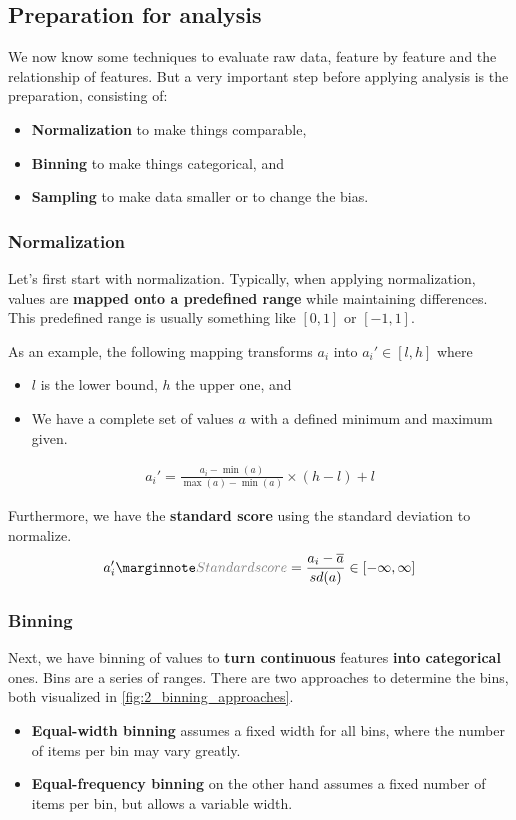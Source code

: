 \subsection{Preparation for analysis}

We now know some techniques to evaluate raw data, feature by feature and the relationship of features. But a very important step before applying analysis is the preparation, consisting of:
\begin{itemize}
  \item \textbf{Normalization} to make things comparable, 
  \item \textbf{Binning} to make things categorical, and 
  \item \textbf{Sampling} to make data smaller or to change the bias.
\end{itemize}

\subsubsection*{Normalization}
Let's first start with normalization. Typically, when applying normalization, values are \textbf{mapped onto a predefined range} while maintaining differences. This predefined range is usually something like $[0, 1]$ or $[-1, 1]$. 

As an example, the following mapping transforms $a_i$ into $a_i'\in[l, h]$ where
\begin{itemize}
  \item $l$ is the lower bound, $h$ the upper one, and
  \item We have a complete set of values $a$ with a defined minimum and maximum given.
\end{itemize}
\begin{align*}
  a_i' = \frac{a_i - \min(a)}{\max(a) - \min(a)} \times (h-l) + l
\end{align*}

Furthermore, we have the \textbf{standard score} using the standard deviation to normalize.
\begin{align*}
  a_i'\sidenote{Standard score} = \frac{a_i - \overline{a}}{sd(a)}\in[-\infty, \infty]
\end{align*}

\subsubsection*{Binning}
Next, we have binning of values to \textbf{turn continuous} features \textbf{into categorical} ones. Bins are a series of ranges. There are two approaches to determine the bins, both visualized in \ref{fig:2_binning_approaches}.
\begin{itemize}
  \item \textbf{Equal-width binning} assumes a fixed width for all bins, where the number of items per bin may vary greatly.
  \item \textbf{Equal-frequency binning} on the other hand assumes a fixed number of items per bin, but allows a variable width. 
\end{itemize}

